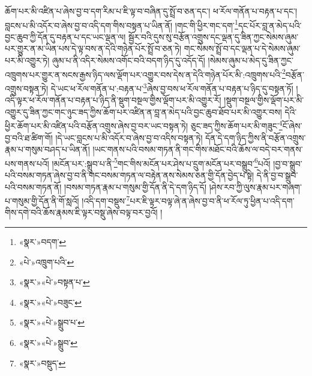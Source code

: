 ཆོག་པར་མི་འཛིན་པ་ཞེས་བྱ་བ་དག་རིམ་པ་ཇི་ལྟ་བ་བཞིན་དུ་སྤྲོ་བ་ཅན་དང་། ཕ་རོལ་གནོན་པ་བརྟན་པ་དང་། བླངས་པ་མི་འདོར་བ་ཞེས་བྱ་བ་འདི་དག་གིས་བསྟན་པ་ཡིན་ནོ། །གང་གི་ཕྱིར་གང་དག་\footnote{«སྣར་»བདག་}དང་པོར་བླ་ན་མེད་པའི་བྱང་ཆུབ་ཀྱི་དོན་དུ་བརྟན་པ་དང་ཡང་ལྡན་ལ། སྦྱོར་བའི་དུས་སུ་བརྩོན་འགྲུས་དང་ལྡན་དུ་ཟིན་ཀྱང་སེམས་ཞུམ་པར་གྱུར་ན་མ་ཡིན་པས་དེ་ལྟ་བས་ན་དེའི་གཉེན་པོར་སྤྲོ་བ་ཅན་ཏེ། གང་སེམས་སྤྲོ་བ་དང་ལྡན་པ་དེ་སེམས་ཞུམ་པར་མི་འགྱུར་ཏེ། ཞུམ་པ་ནི་འདིར་སེམས་འགོང་བའི་བདག་ཉིད་དུ་འདོད་དོ། །སེམས་ཞུམ་པ་མེད་དུ་ཟིན་ཀྱང་འཁྲུགས་པར་གྱུར་ན་སངས་རྒྱས་ཉིད་ལས་ལྡོག་པར་འགྱུར་བས་དེས་ན་དེའི་གཉེན་པོར་མི་:འཁྲུགས་པའི་\footnote{«པེ་»འཁྲུག་པའི་}བརྩོན་འགྲུས་བསྟན་ཏེ། དེ་ཡང་ཕ་རོལ་གནོན་པ་:བརྟན་པ་\footnote{«སྣར་»«པེ་»བསྟན་པ་}ཞེས་བྱ་བས་ཕ་རོལ་གནོན་པ་བརྟན་པ་ཉིད་དུ་བསྟན་ཏོ། །འདི་ལྟར་ཕ་རོལ་གནོན་པ་བརྟན་པ་ཉིད་ནི་སྡུག་བསྔལ་གྱིས་ལྡོག་པར་མི་འགྱུར་རོ། །སྡུག་བསྔལ་གྱིས་ལྡོག་པར་མི་འགྱུར་དུ་ཟིན་ཀྱང་གང་ཉུང་ཟད་ཀྱིས་ཆོག་པར་འཛིན་ན་བླ་ན་མེད་པའི་བྱང་ཆུབ་ཐོབ་པར་མི་འགྱུར་བས། དེའི་ཕྱིར་ཆོག་པར་མི་འཛིན་པའི་བརྩོན་འགྲུས་ཞེས་བྱ་བར་ཡང་བསྟན་ཏེ། ཅུང་ཟད་ཀྱིས་ཆོག་པར་མི་གཟུང་\footnote{«སྣར་»«པེ་»བཟུང་}ངོ་ཞེས་བྱ་བའི་ཐ་ཚིག་གོ། །དེ་ཡང་བླངས་པ་མི་འདོར་བ་ཞེས་བྱ་བ་འདིས་བསྟན་ཏེ། དོན་དེ་དག་ཉིད་ཀྱིས་ནི་བརྩོན་འགྲུས་རྣམ་པ་གསུམ་བཤད་པ་ཡིན་ནོ། །ཡང་གནས་པའི་བསམ་གཏན་ནི་གང་གིས་མཐོང་བའི་ཆོས་ལ་བདེ་བར་གནས་པས་གནས་པའོ། །མངོན་པར་:སྒྲུབ་པ་ནི་\footnote{«སྣར་»«པེ་»སྒྲུབ་པ་}གང་གིས་མངོན་པར་ཤེས་པ་དྲུག་མངོན་པར་བསྒྲུབ་\footnote{«སྣར་»«པེ་»སྒྲུབ་}པའོ། །བྱ་བ་སྒྲུབ་པའི་བསམ་གཏན་ཞེས་བྱ་བ་ནི་གང་བསམ་གཏན་ལ་བརྟེན་ནས་སེམས་ཅན་གྱི་དོན་བྱེད་པ་སྟེ། དེ་ནི་བྱ་བ་སྒྲུབ་པའི་བསམ་གཏན་ནོ། །བསམ་གཏན་རྣམ་པ་གསུམ་གྱི་དོན་ནི་དེ་དག་ཉིད་དོ། །ཤེས་རབ་ཀྱི་ལུས་རྣམ་པར་གཞག་པ་གསུམ་གྱི་དོན་ནི་གོ་སླའོ། །འདི་དག་བསྡུས་\footnote{«སྣར་»བསྡུད་}པར་ཇི་ལྟར་བལྟ་ཞེ་ན་ཞེས་བྱ་བ་ནི་ཕ་རོལ་ཏུ་ཕྱིན་པ་འདི་དག་གིས་དགེ་བའི་ཆོས་རྣམས་ཇི་ལྟར་བསྡུ་ཞེས་བལྟ་བར་བྱའོ། །
